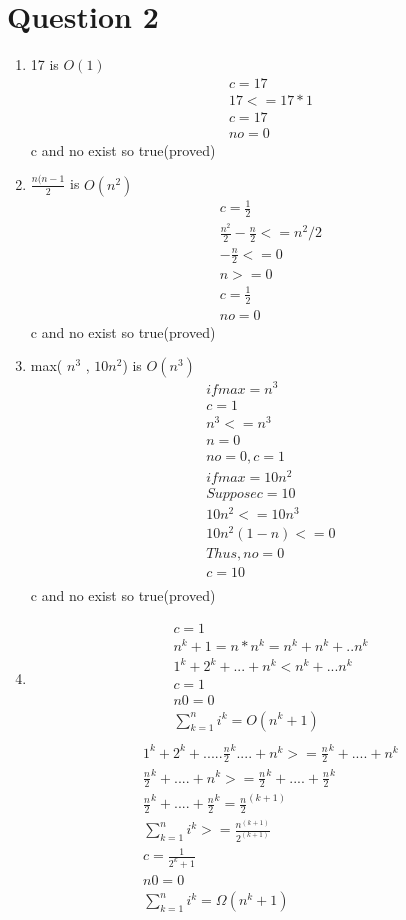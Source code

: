 \documentclass{article}
\begin{document}
\section*{Question 2}
\begin{enumerate}
\item 17 is $O(1)$
\begin{align}
c= 17\\
17 <= 17*1\\
c=17\\
no=0
\end{align}
c and no exist so true(proved)
\item $\frac {n(n-1}{2}$ is $O(n^2)$
\begin{align}
c=\frac{1}{2}\\
\frac {n^2}{2} - \frac{n}{2} <= n^2/2\\
- \frac{n}{2} <= 0\\
n>= 0\\
c=\frac{1}{2}\\
no=0
\end{align}
c and no exist so true(proved)
\item max( $n^3$ , $10 n^2$) is $O(n^3)$
\begin{align}
if max=n^3\\
c=1\\
n^3<=n^3\\
n=0\\
no=0,c=1\\
if max= 10 n^2\\
Suppose c=10\\
10n^2<=10n^3\\
10n^2(1-n)<=0\\
Thus, no=0\\
c=10\\
\end{align}
c and no exist so true(proved)

\item 
\begin{align}
c=1\\
n^k+1=n*n^k=n^k+n^k+..n^k\\
1^k + 2^k +...+ n^k < n^k +...n^k\\
c=1\\
n0=0\\
\sum_{k=1}^{n} i^k = O(n^k+1)\\
\end{align}
\begin{align}
1^k + 2^k +.....\frac{n}{2}^k....+ n^k >= \frac{n}{2}^k+....+ n^k\\
\frac{n}{2}^k+....+ n^k>=\frac{n}{2}^k+....+ \frac{n}{2}^k\\
\frac{n}{2}^k+....+ \frac{n}{2}^k=\frac{n}{2}^(k+1)\\
\sum_{k=1}^{n} i^k >= \frac {n^(k+1)}{2^(k+1)}\\
c=\frac{1}{2^k+1}\\
n0=0\\
\sum_{k=1}^{n} i^k=\Omega(n^k+1)\\
\end{align}


\end{enumerate}
\end{document}
